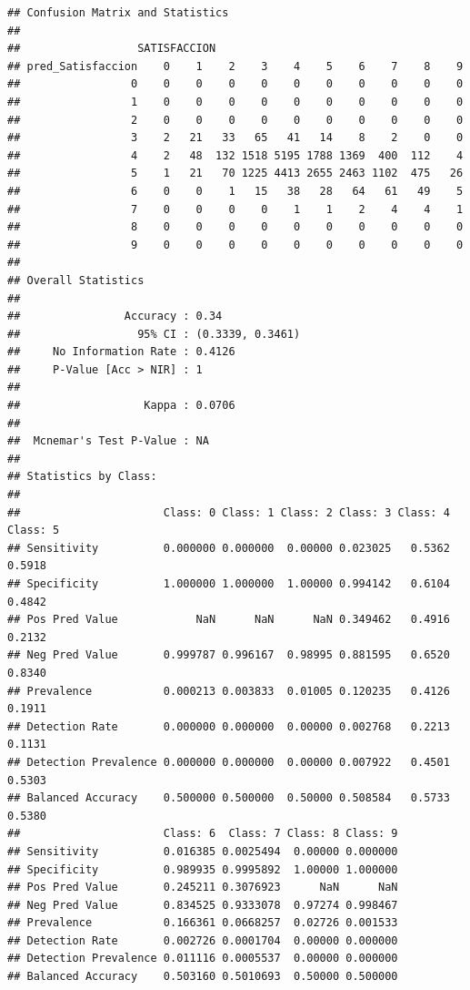\documentclass[
]{article}
\begin{document}
\begin{verbatim}
## Confusion Matrix and Statistics
## 
##                  SATISFACCION
## pred_Satisfaccion    0    1    2    3    4    5    6    7    8    9
##                 0    0    0    0    0    0    0    0    0    0    0
##                 1    0    0    0    0    0    0    0    0    0    0
##                 2    0    0    0    0    0    0    0    0    0    0
##                 3    2   21   33   65   41   14    8    2    0    0
##                 4    2   48  132 1518 5195 1788 1369  400  112    4
##                 5    1   21   70 1225 4413 2655 2463 1102  475   26
##                 6    0    0    1   15   38   28   64   61   49    5
##                 7    0    0    0    0    1    1    2    4    4    1
##                 8    0    0    0    0    0    0    0    0    0    0
##                 9    0    0    0    0    0    0    0    0    0    0
## 
## Overall Statistics
##                                           
##                Accuracy : 0.34            
##                  95% CI : (0.3339, 0.3461)
##     No Information Rate : 0.4126          
##     P-Value [Acc > NIR] : 1               
##                                           
##                   Kappa : 0.0706          
##                                           
##  Mcnemar's Test P-Value : NA              
## 
## Statistics by Class:
## 
##                      Class: 0 Class: 1 Class: 2 Class: 3 Class: 4 Class: 5
## Sensitivity          0.000000 0.000000  0.00000 0.023025   0.5362   0.5918
## Specificity          1.000000 1.000000  1.00000 0.994142   0.6104   0.4842
## Pos Pred Value            NaN      NaN      NaN 0.349462   0.4916   0.2132
## Neg Pred Value       0.999787 0.996167  0.98995 0.881595   0.6520   0.8340
## Prevalence           0.000213 0.003833  0.01005 0.120235   0.4126   0.1911
## Detection Rate       0.000000 0.000000  0.00000 0.002768   0.2213   0.1131
## Detection Prevalence 0.000000 0.000000  0.00000 0.007922   0.4501   0.5303
## Balanced Accuracy    0.500000 0.500000  0.50000 0.508584   0.5733   0.5380
##                      Class: 6  Class: 7 Class: 8 Class: 9
## Sensitivity          0.016385 0.0025494  0.00000 0.000000
## Specificity          0.989935 0.9995892  1.00000 1.000000
## Pos Pred Value       0.245211 0.3076923      NaN      NaN
## Neg Pred Value       0.834525 0.9333078  0.97274 0.998467
## Prevalence           0.166361 0.0668257  0.02726 0.001533
## Detection Rate       0.002726 0.0001704  0.00000 0.000000
## Detection Prevalence 0.011116 0.0005537  0.00000 0.000000
## Balanced Accuracy    0.503160 0.5010693  0.50000 0.500000
\end{verbatim}
\end{document}
